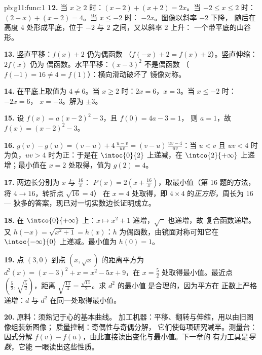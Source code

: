\begin{solution}{pb:g11:func:1}
\textbf{12.} 当 $x \geq 2$ 时：$(x - 2) + (x + 2) = 2x$。当
$-2 \leq x \leq 2$ 时：$(2 - x) + (x + 2) = 4$。当 $x \leq -2$ 时：
$-2x$。图像以斜率 $-2$ 下降，
随后在高度 $4$ 处形成平底，位于 $-2$ 与 $2$ 之间，又以斜率 $2$ 上升：
一个带平底的山谷形。

\textbf{13.} 竖直平移：$f(x) + 2$ 仍为偶函数
（$f(-x) + 2 = f(x) + 2$）。竖直伸缩：$2f(x)$ 仍为
偶函数。水平平移：$(x - 3)^2$ 不是偶函数
（$f(-1) = 16 \neq 4 = f(1)$）：横向滑动破坏了
镜像对称。

\textbf{14.} 在平底上取值为 $4 \neq 6$。当
$x \geq 2$ 时：$2x = 6$，$x = 3$。当 $x \leq -2$ 时：$-2x = 6$，
$x = -3$。解为 $\pm 3$。

\textbf{15.} 设 $f(x) = a(x - 2)^2 - 3$，且 $f(0) = 4a - 3 = 1$，
则 $a = 1$，故 $f(x) = (x - 2)^2 - 3$。

\textbf{16.} $g(v) - g(u) = (v - u) + 4\,\frac{u - v}{uv}
= (v - u)\,\frac{uv - 4}{uv}$：当 $u < v$ 且
$uv < 4$ 时为负，$uv > 4$ 时为正：于是在
$\intoc{0}{2}$ 上递减，在 $\intco{2}{+\infty}$ 上递增；最小值在
$x = 2$ 处取得，值为 $g(2) = 4$。

\textbf{17.} 两边长分别为 $x$ 与 $\frac{16}{x}$：
$P(x) = 2\left(x + \frac{16}{x}\right)$，取最小值（第
16 题的方法，将 $4 \to 16$，转折点 $\sqrt{16} = 4$）
在 $x = 4$ 处取得，即 $4 \times 4$ 的\emph{正方形}，周长为 $16$ ---
狄多的答案，现已对一切实数边长证明成立。

\textbf{18.} 在 $\intco{0}{+\infty}$ 上：$x \mapsto x^2 + 1$
递增，$\sqrt{\phantom{x}}$ 也递增，故
复合函数递增。又 $h(-x) = \sqrt{x^2 + 1} = h(x)$：$h$
为偶函数，由镜面对称可知它在
$\intoc{-\infty}{0}$ 上递减。最小值为 $h(0) = 1$。

\textbf{19.} 点 $(3, 0)$ 到点
$(x, \sqrt x)$ 的距离平方为
$d^2(x) = (x - 3)^2 + x = x^2 - 5x + 9$，在
$x = \frac52$ 处取得最小值。最近点
$\left(\frac52, \sqrt{\frac52}\right)$，距离
$\sqrt{\frac{11}{4}} = \frac{\sqrt{11}}{2}$。求 $d^2$ 的最小值
是合理的，因为平方在
正数上严格递增：$d$ 与 $d^2$ 在同一处取得最小值。

\textbf{20.} 原料：须熟记于心的基本曲线。
加工机器：平移、翻转与伸缩，用以由旧图像组装新图像；
质量控制：奇偶性与奇偶分解，
它们使每项研究减半。测量台：因式分解
$f(v) - f(u)$，由此直接读出变化与最小值。下一章的
有力工具是\emph{导数}，它能
一眼读出这些性质。
\end{solution}
